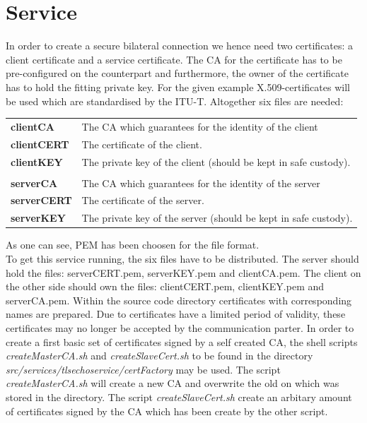 \clearpage
\section{Service}

In order to create a secure bilateral connection we hence need two certificates: a client certificate and a service certificate.
The CA for the certificate has to be pre-configured on the counterpart and furthermore, the owner of the certificate has to hold the fitting private key.
For the given example X.509-certificates will be used which are standardised by the ITU-T.
Altogether six files are needed:
\begin{tabular}{l@{~---~}p{13cm}}
\textbf{clientCA}   & The CA which guarantees for the identity of the client \\
\textbf{clientCERT} & The certificate of the client. \\
\textbf{clientKEY}  & The private key of the client (should be kept in safe custody).\\
\\
\textbf{serverCA}   & The CA which guarantees for the identity of the server \\
\textbf{serverCERT} & The certificate of the server. \\
\textbf{serverKEY}  & The private key of the server (should be kept in safe custody).\\
\end{tabular}
\forcelinebreak
As one can see, PEM has been choosen for the file format.\\

To get this service running, the six files have to be distributed. The server should hold the files: serverCERT.pem, serverKEY.pem and clientCA.pem. The client on the other side should own the files: clientCERT.pem, clientKEY.pem and serverCA.pem.
Within the source code directory certificates with corresponding names are prepared. Due to certificates have a limited period of validity, these certificates may no longer be accepted by the communication parter. In order to create a first basic set of certificates signed by a self created CA, the shell scripts \textit{createMasterCA.sh} and \textit{createSlaveCert.sh} to be found in the directory \textit{src/services/tlsechoservice/certFactory} may be used. The script \textit{createMasterCA.sh} will create a new CA and overwrite the old on which was stored in the directory. The script \textit{createSlaveCert.sh} create an arbitary amount of certificates signed by the CA which has been create by the other script.\\


